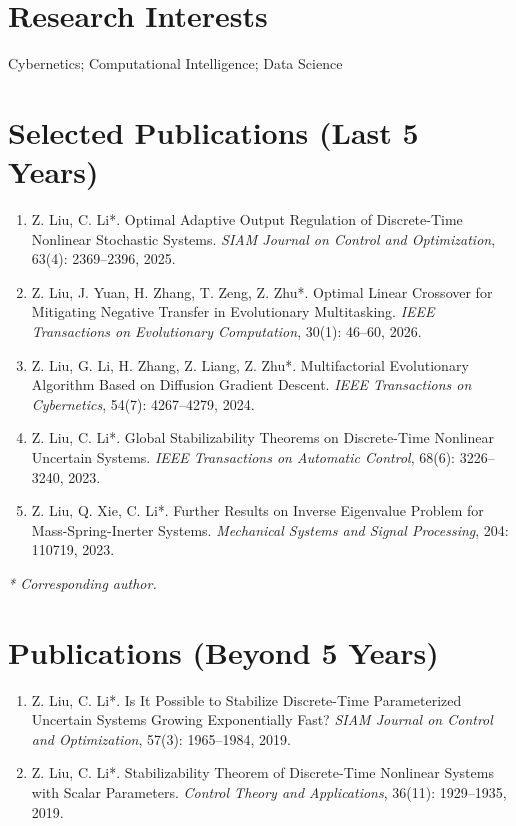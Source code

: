 \documentclass[11pt,a4paper]{article}
\begin{document}
\section{Research Interests}

Cybernetics; Computational Intelligence; Data Science

\section{Selected Publications (Last 5 Years)}

\begin{enumerate}[leftmargin=1.6em,itemsep=4pt,topsep=2pt]
  \item Z. Liu, C. Li*. Optimal Adaptive Output Regulation of Discrete-Time Nonlinear Stochastic Systems. \textit{SIAM Journal on Control and Optimization}, 63(4): 2369--2396, 2025.
  \item Z. Liu, J. Yuan, H. Zhang, T. Zeng, Z. Zhu*. Optimal Linear Crossover for Mitigating Negative Transfer in Evolutionary Multitasking. \textit{IEEE Transactions on Evolutionary Computation}, 30(1): 46--60, 2026.
  \item Z. Liu, G. Li, H. Zhang, Z. Liang, Z. Zhu*. Multifactorial Evolutionary Algorithm Based on Diffusion Gradient Descent. \textit{IEEE Transactions on Cybernetics}, 54(7): 4267--4279, 2024.
  \item Z. Liu, C. Li*. Global Stabilizability Theorems on Discrete-Time Nonlinear Uncertain Systems. \textit{IEEE Transactions on Automatic Control}, 68(6): 3226--3240, 2023.
  \item Z. Liu, Q. Xie, C. Li*. Further Results on Inverse Eigenvalue Problem for Mass-Spring-Inerter Systems. \textit{Mechanical Systems and Signal Processing}, 204: 110719, 2023.
\end{enumerate}

\vspace{2pt}
\textit{* Corresponding author.}

\section{Publications (Beyond 5 Years)}

\begin{enumerate}[leftmargin=1.6em,itemsep=4pt,topsep=2pt]
  \item Z. Liu, C. Li*. Is It Possible to Stabilize Discrete-Time Parameterized Uncertain Systems Growing Exponentially Fast? \textit{SIAM Journal on Control and Optimization}, 57(3): 1965--1984, 2019.
  \item Z. Liu, C. Li*. Stabilizability Theorem of Discrete-Time Nonlinear Systems with Scalar Parameters. \textit{Control Theory and Applications}, 36(11): 1929--1935, 2019.
\end{enumerate}
\end{document}
